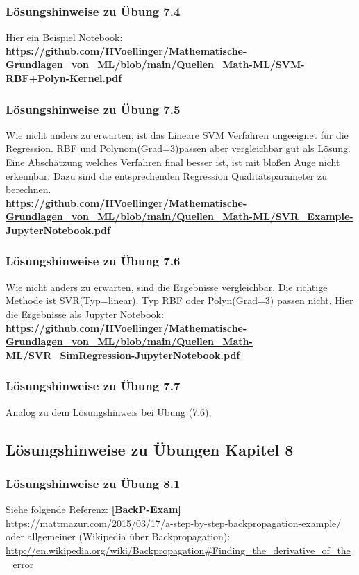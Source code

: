 \documentclass[12pt]{article}
\begin{document}
\subsubsection{Lösungshinweise zu Übung 7.4}
Hier ein Beispiel Notebook:\\[0.2cm]
%
\textbf{\url{https://github.com/HVoellinger/Mathematische-Grundlagen_von_ML/blob/main/Quellen_Math-ML/SVM-RBF+Polyn-Kernel.pdf}} 
%
\subsubsection{Lösungshinweise zu Übung 7.5}
Wie nicht anders zu erwarten, ist das Lineare SVM Verfahren ungeeignet für die Regression. RBF und Polynom(Grad=3)passen aber vergleichbar gut als Lösung. Eine Abschätzung welches Verfahren final besser ist, ist mit bloßen Auge nicht erkennbar. Dazu sind die entsprechenden Regression Qualitätsparameter zu berechnen.\\[0.2cm]
\textbf{\url{https://github.com/HVoellinger/Mathematische-Grundlagen_von_ML/blob/main/Quellen_Math-ML/SVR_Example-JupyterNotebook.pdf}} 
%
\subsubsection{Lösungshinweise zu Übung 7.6}
Wie nicht anders zu erwarten, sind die Ergebnisse vergleichbar. Die richtige Methode ist SVR(Typ=linear). Typ RBF oder Polyn(Grad=3) passen nicht. 
Hier die Ergebnisse als Jupyter Notebook:\\[0.2cm]
%
\textbf{\url{https://github.com/HVoellinger/Mathematische-Grundlagen_von_ML/blob/main/Quellen_Math-ML/SVR_SimRegression-JupyterNotebook.pdf}} 
%
\subsubsection{Lösungshinweise zu Übung 7.7}
Analog zu dem Lösungshinweis bei Übung (7.6),
\newpage

\subsection{Lösungshinweise zu Übungen Kapitel 8}

\subsubsection{Lösungshinweise zu Übung 8.1}
%
Siehe folgende Referenz: \textbf{[BackP-Exam]}\\
\url{https://mattmazur.com/2015/03/17/a-step-by-step-backpropagation-example/} 
oder allgemeiner (Wikipedia über Backpropagation):\\
\url{http://en.wikipedia.org/wiki/Backpropagation#Finding_the_derivative_of_the_error}
\end{document}
